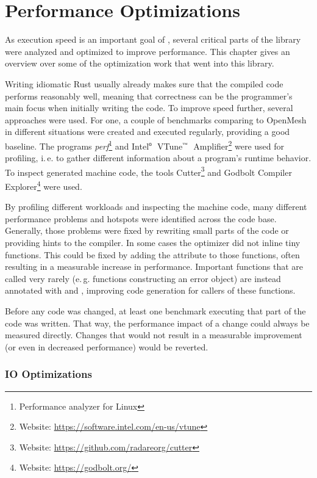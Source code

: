\section{Performance Optimizations}

As execution speed is an important goal of , several critical parts of the library were analyzed and optimized to improve performance.
This chapter gives an overview over some of the optimization work that went into this library.

Writing idiomatic Rust usually already makes sure that the compiled code performs reasonably well, meaning that correctness can be the programmer's main focus when initially writing the code.
To improve speed further, several approaches were used.
For one, a couple of benchmarks comparing  to OpenMesh in different situations were created and executed regularly, providing a good baseline.
The programs \emph{perf}\footnote{Performance analyzer for Linux} and Intel$^\text{\tiny ®}$~VTune$^\text{\tiny ™}$~Amplifier\footnote{Website: \url{https://software.intel.com/en-us/vtune}} were used for profiling, i.\,e. to gather different information about a program's runtime behavior.
To inspect generated machine code, the tools Cutter\footnote{Website: \url{https://github.com/radareorg/cutter}} and Godbolt Compiler Explorer\footnote{Website: \url{https://godbolt.org/}} were used.

By profiling different workloads and inspecting the machine code, many different performance problems and hotspots were identified across the code base.
Generally, those problems were fixed by rewriting small parts of the code or providing hints to the compiler.
In some cases the optimizer did not inline tiny functions.
This could be fixed by adding the  attribute to those functions, often resulting in a measurable increase in performance.
Important functions that are called very rarely (e.\,g. functions constructing an error object) are instead annotated with  and \code{#[cold]}, improving code generation for callers of these functions.

Before any code was changed, at least one benchmark executing that part of the code was written.
That way, the performance impact of a change could always be measured directly.
Changes that would not result in a measurable improvement (or even in decreased performance) would be reverted.


\subsubsection*{IO Optimizations}

